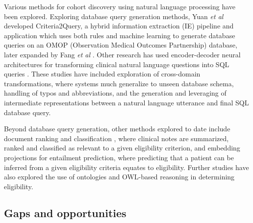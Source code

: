 \documentclass[../main.tex]{subfiles}
\begin{document}
Various methods for cohort discovery using natural language processing have been explored. Exploring database query generation methods, Yuan \textit{et al} developed Criteria2Query, a hybrid information extraction (IE) pipeline and application which uses both rules and machine learning to generate database queries on an OMOP \cite{hripcsak2015observational} (Observation Medical Outcomes Partnership) database, later expanded by Fang \textit{et al} \cite{fang2022combining}. Other research has used encoder-decoder neural architectures for transforming clinical natural language questions into SQL queries \cite{bae2021question, park2021knowledge, wang2020text, pan2021bert, dhayne2021emr2vec}. These studies have included exploration of cross-domain transformations, where systems much generalize to unseen database schema\cite{park2021knowledge}, handling of typos and abbreviations\cite{bae2021question}, and the generation and leveraging of intermediate representations between a natural language utterance and final SQL database query.\cite{pan2021bert} 

Beyond database query generation, other methods explored to date include document ranking and classification \cite{chen2019clinical,soni2020patient}, where clinical notes are summarized, ranked and classified as relevant to a given eligibility criterion, and embedding projections for entailment prediction\cite{dhayne2021emr2vec, zhang2020deepenroll}, where predicting that a patient can be inferred from a given eligibility criteria equates to eligibility. Further studies have also explored the use of ontologies and OWL-based reasoning in determining eligibility\cite{patel2007matching, huang2013semanticct, baader2018patient, johnson2016mimic, patrao2015recruit}.
    
\subsection*{Gaps and opportunities}
\end{document}
